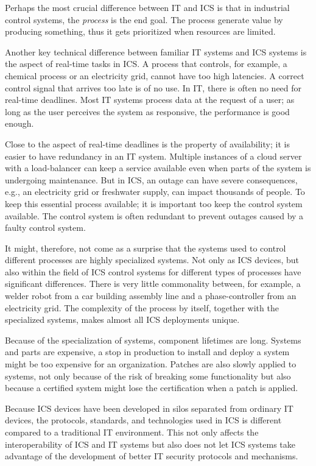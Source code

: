 Perhaps the most crucial difference between IT and ICS is that in industrial control systems, the \emph{process} is the end goal. The process generate value by producing something, thus it gets prioritized when resources are limited.

Another key technical difference between familiar IT systems and ICS systems is the aspect of real-time tasks in ICS. A process that controls, for example, a chemical process or an electricity grid, cannot have too high latencies. A correct control signal that arrives too late is of no use. In IT, there is often no need for real-time deadlines. Most IT systems process data at the request of a user; as long as the user perceives the system as responsive, the performance is good enough.

Close to the aspect of real-time deadlines is the property of availability; it is easier to have redundancy in an IT system. Multiple instances of a cloud server with a load-balancer can keep a service available even when parts of the system is undergoing maintenance. But in ICS, an outage can have severe consequences, e.g., an electricity grid or freshwater supply, can impact thousands of people. To keep this essential process available; it is important too keep the control system available. The control system is often redundant to prevent outages caused by a faulty control system.


It might, therefore, not come as a surprise that the systems used to control different processes are highly specialized systems. Not only as ICS devices, but also within the field of ICS control systems for different types of processes have significant differences. There is very little commonality between, for example, a welder robot from a car building assembly line and a phase-controller from an electricity grid. The complexity of the process by itself, together with the specialized systems, makes almost all ICS deployments unique.

Because of the specialization of systems, component lifetimes are long. Systems and parts are expensive, a stop in production to install and deploy a system might be too expensive for an organization. Patches are also slowly applied to systems, not only because of the risk of breaking some functionality but also because a certified system might lose the certification when a patch is applied.

Because ICS devices have been developed in silos separated from ordinary IT devices, the protocols, standards, and technologies used in ICS is different compared to a traditional IT environment. This not only affects the interoperability of ICS and IT systems but also does not let ICS systems take advantage of the development of better IT security protocols and mechanisms.

